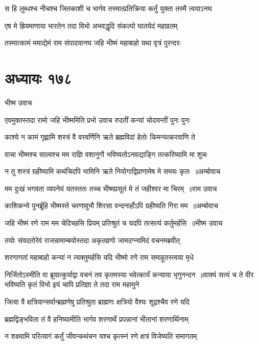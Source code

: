 \twolineshloka
{स हि लुब्धश्च नीचश्च जितकाशी च भार्गव}
{तस्मात्प्रतिक्रिया कर्तुं युक्ता तस्मै त्वयाऽनघ}


\twolineshloka
{एष मे ह्रियमाणाया भारतेन तदा विभो}
{अभवद्धृदि संकल्पो घातयेदं महाव्रतम्}


\twolineshloka
{तस्मात्कामं ममाद्येमं राम संपादयानघ}
{जहि भीष्मं महाबाहो यथा वृत्रं पुरन्दरः}


\chapter{अध्यायः १७८}
\twolineshloka
{भीष्म उवाच}
{}


\twolineshloka
{एवमुक्तस्तदा रामो जहि भीष्ममिति प्रभो}
{उवाच रुदतीं कन्यां चोदयन्तीं पुनः पुनः}


\twolineshloka
{काश्ये न कामं गृह्णामि शस्त्रं वै वरवर्णिनि}
{ऋते ब्रह्मविदां हेतोः किमन्यत्करवाणि ते}


\twolineshloka
{वाचा भीष्मश्च साल्वश्च मम राज्ञि वशानुगौ}
{भविष्यतोऽनवद्याङ्गि तत्करिष्यामि मा शुचः}


\threelineshloka
{न तु शस्त्रं ग्रहीष्यामि कथंचिदपि भामिनि}
{ऋते नियोगाद्विप्राणामेष मे समयः कृतः ॥अम्बोवाच}
{}


\threelineshloka
{मम दुःखं भगवता व्यपनेयं यतस्ततः}
{तच्च भीष्मप्रसूतं मे तं जहीश्वर मा चिरम् ॥राम उवाच}
{}


\threelineshloka
{काशिकन्ये पुनर्ब्रूहि भीष्मस्ते चरणावुभौ}
{शिरसा वन्दनार्होऽपि ग्रहीष्यति गिरा मम ॥अम्बोवाच}
{}


\threelineshloka
{जहि भीष्मं रणे राम मम चेदिच्छसि प्रियम्}
{प्रतिश्रुतं च यदपि तत्सत्यं कर्तुमर्हसि ॥भीष्म उवाच}
{}


\twolineshloka
{तयोः संवदतोरेवं राजन्रामाम्बयोस्तदा}
{अकृतव्रणो जामदग्न्यमिदं वचनमब्रवीत्}


\twolineshloka
{शरणागतां महाबाहो कन्यां न त्यक्तुमर्हसि}
{यदि भीष्मो रणे राम समाहूतस्त्वया मृधे}


\threelineshloka
{निर्जितोऽस्मीति वा ब्रूयात्कुर्याद्वा वचनं तव}
{कृतमस्या भवेत्कार्यं कन्याया भृगुनन्दन ॥वाक्यं सत्यं च ते वीर भविष्यति कृतं विभो}
{इयं चापि प्रतिज्ञा ते तदा राम महामुने}


\twolineshloka
{जित्वा वै क्षत्रियान्सर्वान्ब्रह्मणेषु प्रतिश्रुता}
{ब्राह्मणः क्षत्रियो वैश्यः शूद्रश्चैव रणे यदि}


\twolineshloka
{ब्रह्मद्विङ्भविता तं वै हनिष्यामीति भार्गव}
{शरणार्थे प्रपन्नानां भीतानां शरणार्थिनाम्}


\twolineshloka
{न शक्ष्यामि परित्यागं कर्तुं जीवन्कथंचन}
{यश्च कृत्स्नं रणे क्षत्रं विजेष्यति समागतम्}


